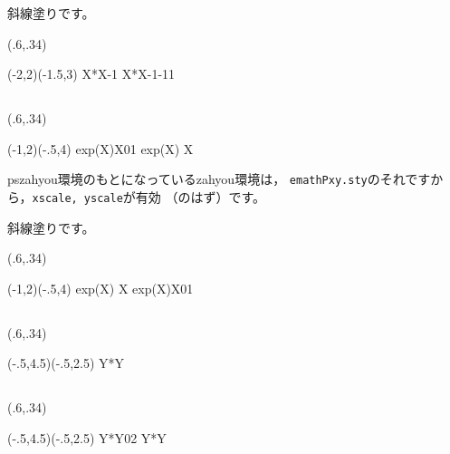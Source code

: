 \documentclass[a4j]{jarticle}
\begin{document}
斜線塗りです。

\begin{showEx}(.6,.34){}
\begin{pszahyou}[ul=8mm](-2,2)(-1.5,3)
  \def\Fx{X*X-1}
  \YGurafu*\Fx
  \YNuri*\Fx{-1}{1}
\end{pszahyou}
\end{showEx}

\subsection{\texorpdfstring{}{YNurii}}
\begin{showEx}(.6,.34){}
\begin{pszahyou}[ul=8mm,xscale=1.5](-1,2)(-.5,4)
  \def\Fx{exp(X)}
  \def\Gx{\Napier*X}
  \YNurii\Fx\Gx{0}{1}
  \YGurafu*\Fx
  \YGurafu*\Gx
  \Put\T[syaei=xy,ylabel=$e$]{}
\end{pszahyou}
\end{showEx}

\textsf{pszahyou}環境のもとになっている\textsf{zahyou}環境は，
\texttt{emathPxy.sty}のそれですから，\texttt{xscale, yscale}が有効
（のはず）です。

斜線塗りです。

\begin{showEx}(.6,.34){}
\begin{pszahyou}[ul=8mm,xscale=1.5](-1,2)(-.5,4)
  \def\Fx{exp(X)}
  \def\Gx{\Napier*X}
  \YGurafu*\Fx
  \YGurafu*\Gx
  \YNurii*[-45]\Fx\Gx{0}{1}
  \Put\T[syaei=xy,ylabel=$e$]{}
\end{pszahyou}
\end{showEx}

\subsection{\texorpdfstring{}{XGurafu}}
\begin{showEx}(.6,.34){}
\begin{pszahyou}[ul=8mm](-.5,4.5)(-.5,2.5)
  \def\Fy{Y*Y}
  \XGurafu*[sitay=0]\Fy
  \Put\A[syaei=xy]{}
\end{pszahyou}
\end{showEx}

\subsection{\texorpdfstring{}{Xnuri}}
\begin{showEx}(.6,.34){}
\begin{pszahyou}[ul=8mm](-.5,4.5)(-.5,2.5)
  \def\Fy{Y*Y}
  \XNuri\Fy{0}{2}
  \XGurafu*[sitay=0]\Fy
  \Drawline{\O\A}
  \Put\A[syaei=xy]{}
\end{pszahyou}
\end{showEx}
\end{document}
